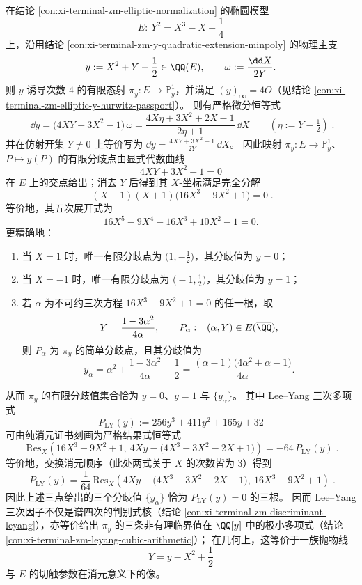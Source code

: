 \begin{conclusion}\label{con:xi-terminal-zm-leyang-ramification-critical-values}
在结论 \ref{con:xi-terminal-zm-elliptic-normalization} 的椭圆模型
\[
E:\ Y^2=X^3-X+\frac14
\]
上，沿用结论 \ref{con:xi-terminal-zm-y-quadratic-extension-minpoly} 的物理主支
\[
y:=X^2+Y-\frac12\in\QQ(E),
\qquad
\omega:=\frac{\dd X}{2Y}.
\]
则 \(y\) 诱导次数 \(4\) 的有限态射 \(\pi_y:E\to\mathbb P^1_y\)，并满足 \((y)_\infty=4O\)（见结论 \ref{con:xi-terminal-zm-elliptic-y-hurwitz-passport}）。
则有严格微分恒等式
\[
\boxed{\;
\dd y=\bigl(4XY+3X^2-1\bigr)\,\omega
=\frac{4X\eta+3X^2+2X-1}{2\eta+1}\,\dd X\qquad(\eta:=Y-\tfrac12)\; }.
\]
并在仿射开集 \(Y\neq 0\) 上等价写为 \(\dd y=\frac{4XY+3X^2-1}{2Y}\,\dd X\)。
因此映射 \(\pi_y:E\to\mathbb P^1_y\)、\(P\mapsto y(P)\) 的有限分歧点由显式代数曲线
\[
4XY+3X^2-1=0
\]
在 \(E\) 上的交点给出；消去 \(Y\) 后得到其 \(X\)-坐标满足完全分解
\[
\boxed{\;
(X-1)(X+1)\bigl(16X^3-9X^2+1\bigr)=0\; }.
\]
等价地，其五次展开式为
\[
16X^{5}-9X^{4}-16X^{3}+10X^{2}-1=0.
\]
更精确地：
\begin{enumerate}
  \item 当 \(X=1\) 时，唯一有限分歧点为 \(\bigl(1,-\tfrac12\bigr)\)，其分歧值为 \(y=0\)；
  \item 当 \(X=-1\) 时，唯一有限分歧点为 \(\bigl(-1,\tfrac12\bigr)\)，其分歧值为 \(y=1\)；
  \item 若 \(\alpha\) 为不可约三次方程 \(16X^{3}-9X^{2}+1=0\) 的任一根，取
  \[
  Y=\frac{1-3\alpha^{2}}{4\alpha},
  \qquad
  P_{\alpha}:=(\alpha,Y)\in E(\overline{\QQ}),
  \]
  则 \(P_{\alpha}\) 为 \(\pi_y\) 的简单分歧点，且其分歧值为
  \[
  y_{\alpha}
  =\alpha^{2}+\frac{1-3\alpha^{2}}{4\alpha}-\frac12
  =\frac{(\alpha-1)\bigl(4\alpha^{2}+\alpha-1\bigr)}{4\alpha}.
  \]
\end{enumerate}
从而 \(\pi_y\) 的有限分歧值集合恰为 \(y=0\)、\(y=1\) 与 \(\{y_{\alpha}\}\)。
其中 Lee--Yang 三次多项式
\[
P_{\mathrm{LY}}(y):=256y^3+411y^2+165y+32
\]
可由纯消元证书刻画为严格结果式恒等式
\[
\boxed{\;
\mathrm{Res}_X\!\left(16X^3-9X^2+1,\ 4Xy-\bigl(4X^3-3X^2-2X+1\bigr)\right)
=-64\,P_{\mathrm{LY}}(y)\; }.
\]
等价地，交换消元顺序（此处两式关于 \(X\) 的次数皆为 \(3\)）得到
\[
\boxed{\;
P_{\mathrm{LY}}(y)=\frac1{64}\,
\mathrm{Res}_X\!\left(4Xy-\bigl(4X^3-3X^2-2X+1\bigr),\ 16X^3-9X^2+1\right)\; }.
\]
因此上述三点给出的三个分歧值 \(\{y_{\alpha}\}\) 恰为 \(P_{\mathrm{LY}}(y)=0\) 的三根。
因而 Lee--Yang 三次因子不仅是谱四次的判别式核（结论 \ref{con:xi-terminal-zm-discriminant-leyang}），亦等价给出 \(\pi_y\) 的三条非有理临界值在 \(\QQ[y]\) 中的极小多项式（结论 \ref{con:xi-terminal-zm-leyang-cubic-arithmetic}）；
在几何上，这等价于一族抛物线
\[
Y=y-X^2+\frac12
\]
与 \(E\) 的切触参数在消元意义下的像。
\end{conclusion}
